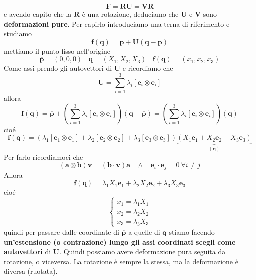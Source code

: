 \documentclass[10pt,a4paper,twoside]{book}
\begin{document}
\begin{equation*}
\mathbf{F} =\mathbf{RU} =\mathbf{VR}
\end{equation*}
e avendo capito che la $\mathbf{R}$ è una rotazione, deduciamo che $\mathbf{U}$ e $\mathbf{V}$ sono \textbf{deformazioni pure}. Per capirlo introduciamo una terna di riferimento e studiamo
\begin{equation*}
\mathbf{f}(\mathbf{q}) =\overline{\mathbf{p}} +\mathbf{U}(\mathbf{q} -\overline{\mathbf{p}})
\end{equation*}
mettiamo il punto fisso nell'origine
\begin{equation*}
\overline{\mathbf{p}} =( 0,0,0) \ \ \ \ \mathbf{q} =( X_{1} ,X_{2} ,X_{3}) \ \ \ \ \mathbf{f}(\mathbf{q}) =( x_{1} ,x_{2} ,x_{3})
\end{equation*}
Come assi prendo gli autovettori di $\mathbf{U}$ e ricordiamo che
\begin{equation*}
\mathbf{U} =\sum\limits ^{3}_{i=1} \lambda _{i}[\mathbf{e}_{i} \otimes \mathbf{e}_{i}]
\end{equation*}
allora
\begin{equation*}
\mathbf{f}(\mathbf{q}) =\overline{\mathbf{p}} +\left(\sum\limits ^{3}_{i=1} \lambda _{i}[\mathbf{e}_{i} \otimes \mathbf{e}_{i}]\right)(\mathbf{q} -\overline{\mathbf{p}}) =\left(\sum\limits ^{3}_{i=1} \lambda _{i}[\mathbf{e}_{i} \otimes \mathbf{e}_{i}]\right)(\mathbf{q})
\end{equation*}
cioé
\begin{equation*}
\mathbf{f}(\mathbf{q}) =( \lambda _{1}[\mathbf{e}_{1} \otimes \mathbf{e}_{1}] +\lambda _{2}[\mathbf{e}_{2} \otimes \mathbf{e}_{2}] +\lambda _{3}[\mathbf{e}_{3} \otimes \mathbf{e}_{3}])\underbrace{( X_{1}\mathbf{e}_{1} +X_{2}\mathbf{e}_{2} +X_{3}\mathbf{e}_{3})}_{(\mathbf{q})}
\end{equation*}
Per farlo ricordiamoci che
\begin{equation*}
(\mathbf{a} \otimes \mathbf{b})\mathbf{v} =(\mathbf{b} \cdotp \mathbf{v})\mathbf{a} \ \ \ \ \land \ \ \ \ \mathbf{e}_{i} \cdotp \mathbf{e}_{j} =0\ \forall i\neq j
\end{equation*}
Allora
\begin{equation*}
\boxed{\mathbf{f}(\mathbf{q}) =\lambda _{1} X_{1}\mathbf{e}_{1} +\lambda _{2} X_{2}\mathbf{e}_{2} +\lambda _{3} X_{3}\mathbf{e}_{3}}
\end{equation*}
cioé
\begin{equation*}
\begin{cases}
x_{1} =\lambda _{1} X_{1}\\
x_{2} =\lambda _{2} X_{2}\\
x_{3} =\lambda _{3} X_{3}
\end{cases}
\end{equation*}
quindi per passare dalle coordinate di $\overline{\mathbf{p}}$ a quelle di $\mathbf{q}$ stiamo facendo \textbf{un'estensione (o contrazione) lungo gli assi coordinati scegli come autovettori} di $\mathbf{U}$. Quindi possiamo avere deformazione pura seguita da rotazione, o viceversa. La rotazione è sempre la stessa, ma la deformazione è diversa (ruotata).
\end{document}
